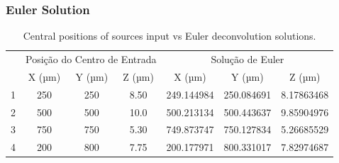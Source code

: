 \subsubsection{Euler Solution}




\begin{table}[htbp]
\caption{Central positions of sources input vs Euler deconvolution solutions.}
\label{tab:eulerresults}
\centering
\begin{tabular}[width=1.0\textwidth]{ccccccc}
\rowcolor[HTML]{E7E7E7} 
\cellcolor[HTML]{E7E7E7}                         & \multicolumn{3}{c}{\cellcolor[HTML]{E7E7E7}Posição do Centro de   Entrada} & \multicolumn{3}{c}{\cellcolor[HTML]{E7E7E7}Solução de Euler} \\
\rowcolor[HTML]{E7E7E7} 
\multirow{-2}{*}{\cellcolor[HTML]{E7E7E7}Esfera} & X (µm)                  & Y (µm)                  & Z (µm)                 & X (µm)             & Y (µm)             & Z (µm)             \\
1                                                & 250                     & 250                     & 8.50                   & 249.144984         & 250.084691         & 8.17863468         \\
\rowcolor[HTML]{E7E7E7} 
2                                                & 500                     & 500                     & 10.0                   & 500.213134         & 500.443637         & 9.85904976         \\
3                                                & 750                     & 750                     & 5.30                   & 749.873747         & 750.127834         & 5.26685529         \\
\rowcolor[HTML]{E7E7E7} 
4                                                & 200                     & 800                     & 7.75                   & 200.177971         & 800.331017         & 7.82974687        
\end{tabular}
\end{table}


